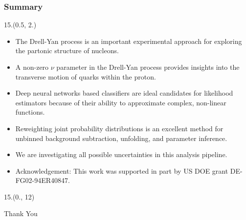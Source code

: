 \documentclass[10pt, xcolor={dvipsnames}, sans, mathserif, aspectratio=169]{beamer}
\newenvironment{List}[2]
{\begin{textblock}{#1}#2
\begin{itemize}}
{\end{itemize}
\end{textblock}}
\begin{document}
\begin{frame}

\end{frame}

\begin{frame}
\frametitle{Summary}

\begin{List}{15.}{(0.5, 2.)}

    \item The Drell-Yan process is an important experimental approach for exploring the partonic structure of nucleons.
	
	\item A non-zero $\nu$ parameter in the Drell-Yan process provides insights into the transverse motion of quarks within the proton.
	
	\item Deep neural networks based classifiers are ideal candidates for likelihood estimators because of their ability to approximate complex, non-linear functions.
	
	\item Reweighting joint probability distributions is an excellent method for unbinned background subtraction, unfolding, and parameter inference.
	
	\item We are investigating all possible uncertainties in this analysis pipeline.
	
	\item Acknowledgement: This work was supported in part by US DOE grant DE-FG02-94ER40847.
	
\end{List}

\begin{textblock}{15.}(0., 12)
\begin{center}
	Thank You
\end{center}
\end{textblock}

\end{frame}
\end{document}
